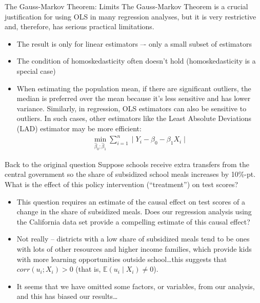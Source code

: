 \documentclass[notes,10pt, aspectratio=169]{beamer}
\begin{document}
\begin{frame}{The Gauss-Markov Theorem: Limits}
The Gauss-Markov Theorem is a crucial justification for using OLS in many regression analyses, but it is very restrictive and, therefore, has serious practical limitations.
\begin{itemize}
    \item The result is only for linear estimators –- only a small subset of estimators
    \item The condition of homoskedasticity often doesn’t hold (homoskedasticity is a special case)
    \item When estimating the population mean, if there are significant outliers, the median is preferred over the mean because it's less sensitive and has lower variance. Similarly, in regression, OLS estimators can also be sensitive to outliers. In such cases, other estimators like the Least Absolute Deviations (LAD) estimator may be more efficient:
    \begin{eqnarray*}
        \min_{\hat{\beta}_0;\hat{\beta}_1}\sum_{i=1}^n \mid Y_i - \beta_0 - \beta_1 X_i \mid 
    \end{eqnarray*}
\end{itemize}
\end{frame}


\begin{frame}{Back to the original question}
Suppose schools receive extra transfers from the central government so the share of subsidized school meals increases by 10\%-pt. What is the effect of this policy intervention (“treatment”) on test scores? 
\begin{itemize}
    \item This question requires an estimate of the causal effect on test scores of a change in the share of subsidized meals. Does our regression analysis using the California data set provide a compelling estimate of this causal effect?
    \item Not really – districts with a low share of subsidized meals tend to be ones with lots of other resources and higher income families, which provide kids with more learning opportunities outside school…this suggests that $corr(u_i; X_i)>0$ (that is, $\mathbb{E}(u_i\mid X_i)\neq 0$).
    \item It seems that we have omitted some factors, or variables, from our analysis, and this has biased our results…
\end{itemize}
\end{frame}
\end{document}
